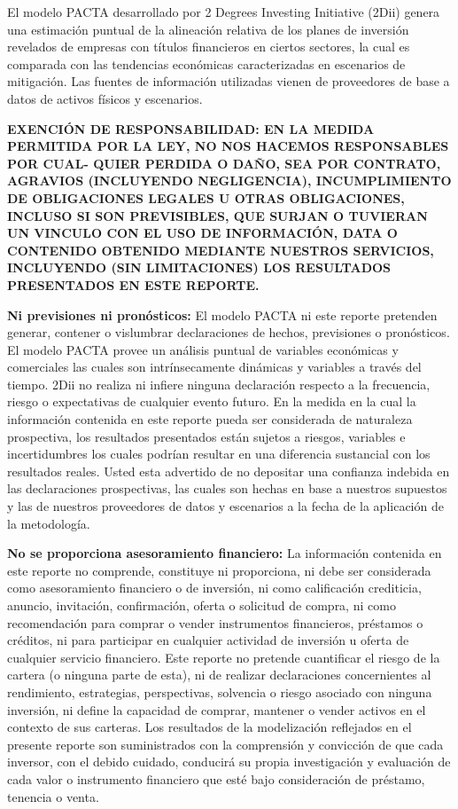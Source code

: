 \documentclass[10pt,table]{article}\usepackage[]{graphicx}\usepackage[]{color}
\begin{document}
	
	El modelo PACTA desarrollado por 2 Degrees Investing Initiative (2Dii) genera una estimación puntual de la alineación relativa de los planes de inversión revelados de empresas con títulos financieros en ciertos sectores, la cual es comparada con las tendencias económicas caracterizadas en escenarios de mitigación. Las fuentes de información utilizadas vienen de proveedores de base a datos de activos físicos y escenarios.
	
	\textbf{EXENCIÓN DE RESPONSABILIDAD: EN LA MEDIDA PERMITIDA POR LA LEY, NO NOS HACEMOS RESPONSABLES POR CUAL-
		QUIER PERDIDA O DAÑO, SEA POR CONTRATO, AGRAVIOS (INCLUYENDO NEGLIGENCIA), INCUMPLIMIENTO DE OBLIGACIONES LEGALES U OTRAS OBLIGACIONES, INCLUSO SI SON PREVISIBLES, QUE SURJAN O TUVIERAN UN VINCULO CON EL USO DE INFORMACIÓN, DATA O CONTENIDO OBTENIDO MEDIANTE NUESTROS SERVICIOS, INCLUYENDO (SIN LIMITACIONES) LOS RESULTADOS PRESENTADOS EN ESTE REPORTE.}
	
	\textbf{Ni previsiones ni pronósticos: }El modelo PACTA ni este reporte pretenden generar, contener o vislumbrar declaraciones de hechos, previsiones o pronósticos. El modelo PACTA provee un análisis puntual de variables económicas y comerciales las cuales son intrínsecamente dinámicas y variables a través del tiempo. 2Dii no realiza ni infiere ninguna declaración respecto a la frecuencia, riesgo o expectativas de cualquier evento futuro. En la medida en la cual la información contenida en este reporte pueda ser considerada de naturaleza prospectiva, los resultados presentados están sujetos a riesgos, variables e incertidumbres los cuales podrían resultar en una diferencia sustancial con los resultados reales. Usted esta advertido de no depositar una confianza indebida en las declaraciones prospectivas, las cuales son hechas en base a nuestros supuestos y las de nuestros  proveedores de datos y escenarios a la fecha de la aplicación de la metodología. 
	
	\textbf{No se proporciona asesoramiento financiero: }La información contenida en este reporte no comprende, constituye ni proporciona, ni debe ser considerada como asesoramiento financiero o de inversión, ni como calificación crediticia, anuncio, invitación, confirmación, oferta o solicitud de compra, ni como recomendación para comprar o vender instrumentos financieros, préstamos o créditos, ni para participar en cualquier actividad de inversión u oferta de cualquier servicio financiero. Este reporte no pretende cuantificar el riesgo de la cartera (o ninguna parte de esta), ni de realizar declaraciones concernientes al rendimiento, estrategias, perspectivas, solvencia o riesgo asociado con ninguna inversión, ni define la capacidad de comprar, mantener o vender activos en el contexto de sus carteras. Los resultados de la modelización reflejados en el presente reporte son suministrados con la comprensión y convicción de que cada inversor, con el debido cuidado, conducirá su propia investigación y evaluación de cada valor o instrumento financiero que esté bajo consideración de préstamo, tenencia o venta.
	
\end{document}
